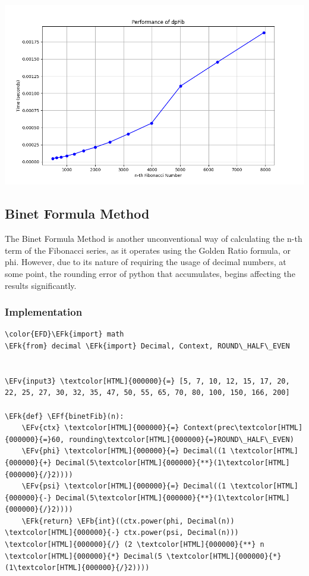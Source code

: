 \documentclass[a4paper,12pt]{article}
\newcommand{\EFk}[1]{\textcolor{EFk}{#1}} %
\newcommand{\EFb}[1]{\textcolor{EFb}{#1}} %
\newcommand{\EFf}[1]{\textcolor{EFf}{#1}} %
\newcommand{\EFv}[1]{\textcolor{EFv}{#1}} %
\begin{document}
\begin{center}
\includegraphics[width=.9\linewidth]{dinamicFib.png}
\label{org070cbde}
\end{center}
\subsection{Binet Formula Method}
\label{sec:org6de399f}
The Binet Formula Method is another unconventional way of calculating the n-th term of the
Fibonacci series, as it operates using the Golden Ratio formula, or phi. However, due to its nature of
requiring the usage of decimal numbers, at some point, the rounding error of python that accumulates,
begins affecting the results significantly.
\subsubsection{Implementation}
\label{sec:org4ce674d}
\begin{Code}
\begin{Verbatim}
\color{EFD}\EFk{import} math
\EFk{from} decimal \EFk{import} Decimal, Context, ROUND\_HALF\_EVEN


\EFv{input3} \textcolor[HTML]{000000}{=} [5, 7, 10, 12, 15, 17, 20, 22, 25, 27, 30, 32, 35, 47, 50, 55, 65, 70, 80, 100, 150, 166, 200]

\EFk{def} \EFf{binetFib}(n):
    \EFv{ctx} \textcolor[HTML]{000000}{=} Context(prec\textcolor[HTML]{000000}{=}60, rounding\textcolor[HTML]{000000}{=}ROUND\_HALF\_EVEN)
    \EFv{phi} \textcolor[HTML]{000000}{=} Decimal((1 \textcolor[HTML]{000000}{+} Decimal(5\textcolor[HTML]{000000}{**}(1\textcolor[HTML]{000000}{/}2))))
    \EFv{psi} \textcolor[HTML]{000000}{=} Decimal((1 \textcolor[HTML]{000000}{-} Decimal(5\textcolor[HTML]{000000}{**}(1\textcolor[HTML]{000000}{/}2))))
    \EFk{return} \EFb{int}((ctx.power(phi, Decimal(n)) \textcolor[HTML]{000000}{-} ctx.power(psi, Decimal(n))) \textcolor[HTML]{000000}{/} (2 \textcolor[HTML]{000000}{**} n \textcolor[HTML]{000000}{*} Decimal(5 \textcolor[HTML]{000000}{*} (1\textcolor[HTML]{000000}{/}2))))
\end{Verbatim}
\end{Code}
\end{document}
